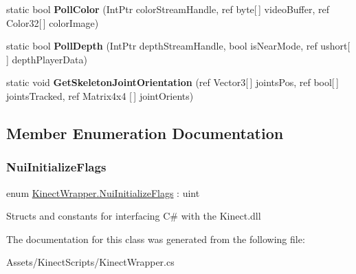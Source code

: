 \begin{DoxyCompactItemize}
\item 
\mbox{\label{class_kinect_wrapper_a7432c928afbb7fae1bf3ed6b3efef0d7}} 
static bool {\bfseries Poll\+Color} (Int\+Ptr color\+Stream\+Handle, ref byte\mbox{[}$\,$\mbox{]} video\+Buffer, ref Color32\mbox{[}$\,$\mbox{]} color\+Image)
\item 
\mbox{\label{class_kinect_wrapper_aa489e01c830842c81e6ecaa15d773efb}} 
static bool {\bfseries Poll\+Depth} (Int\+Ptr depth\+Stream\+Handle, bool is\+Near\+Mode, ref ushort\mbox{[}$\,$\mbox{]} depth\+Player\+Data)
\item 
\mbox{\label{class_kinect_wrapper_a7afb7682da9118353458bb6c5c0c9636}} 
static void {\bfseries Get\+Skeleton\+Joint\+Orientation} (ref Vector3\mbox{[}$\,$\mbox{]} joints\+Pos, ref bool\mbox{[}$\,$\mbox{]} joints\+Tracked, ref Matrix4x4 \mbox{[}$\,$\mbox{]} joint\+Orients)
\end{DoxyCompactItemize}


\subsection{Member Enumeration Documentation}
\mbox{\label{class_kinect_wrapper_aa14891c91bfa8c6fe4761146055656da}} 
\subsubsection{\texorpdfstring{Nui\+Initialize\+Flags}{NuiInitializeFlags}}
{\footnotesize\ttfamily enum \mbox{\hyperlink{class_kinect_wrapper_aa14891c91bfa8c6fe4761146055656da}{Kinect\+Wrapper.\+Nui\+Initialize\+Flags}} \+: uint\hspace{0.3cm}{\ttfamily [strong]}}



Structs and constants for interfacing C\# with the Kinect.\+dll 



The documentation for this class was generated from the following file\+:\begin{DoxyCompactItemize}
\item 
Assets/\+Kinect\+Scripts/Kinect\+Wrapper.\+cs\end{DoxyCompactItemize}
